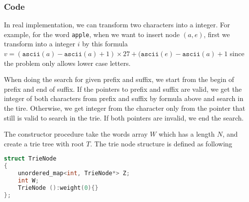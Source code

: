 \subsubsection{Code}
In real implementation, we can transform two characters into a integer. For example, for the word \texttt{apple}, when we want to insert node $(a,e)$, first we transform into a integer $i$ by this formula $v=(\texttt{ascii}(a) - \texttt{ascii}(a) + 1) \times 27 + (\texttt{ascii}(e)-\texttt{ascii}(a) + 1$ since the problem only allows lower case letters.
\par
When doing the search for given prefix and suffix, we start from the begin of prefix and end of suffix. If the pointers to prefix and suffix are valid, we get the integer of both characters from prefix and suffix by formula above and search in the tire. Otherwise, we get integer from the character only from the pointer that still is valid to search in the trie. If both pointers are invalid, we end the search.
\par
The constructor procedure take the words array $W$ which has a length $N$, and create a trie tree with root $T$. The trie node structure is defined as following
\begin{lstlisting}[backgroundcolor=\color{blue!80!green!10}, keywordstyle=\bfseries\color{green!40!black}, commentstyle=\itshape\color{purple!40!black},language=C++]
struct TrieNode
{
	unordered_map<int, TrieNode*> Z;
	int W;
	TrieNode ():weight(0){}
};
\end{lstlisting}
\setcounter{algorithm}{0}
